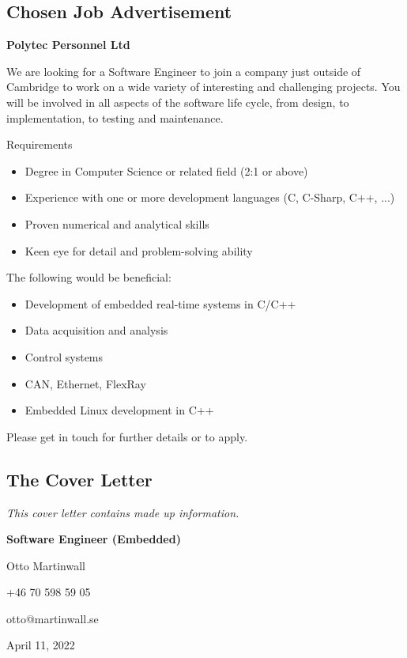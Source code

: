 \subsection{Chosen Job Advertisement}

\textbf{Polytec Personnel Ltd}

We are looking for a Software Engineer to join a company just outside of Cambridge to work on a wide variety of interesting and challenging projects. You will be involved in all aspects of the software life cycle, from design, to implementation, to testing and maintenance.

Requirements

\begin{itemize}
	\item Degree in Computer Science or related field (2:1 or above)
	\item Experience with one or more development languages (C, C-Sharp, C++, ...)
	\item Proven numerical and analytical skills
	\item Keen eye for detail and problem-solving ability
\end{itemize}

The following would be beneficial: 

\begin{itemize}
	\item Development of embedded real-time systems in C/C++
	\item Data acquisition and analysis
	\item Control systems
	\item CAN, Ethernet, FlexRay
	\item Embedded Linux development in C++
\end{itemize}

Please get in touch for further details or to apply.

\subsection{The Cover Letter}

\textit{This cover letter contains made up information.}

\newpage
\textbf{Software Engineer (Embedded)}

Otto Martinwall

+46 70 598 59 05

otto@martinwall.se

April 11, 2022
\bigskip

